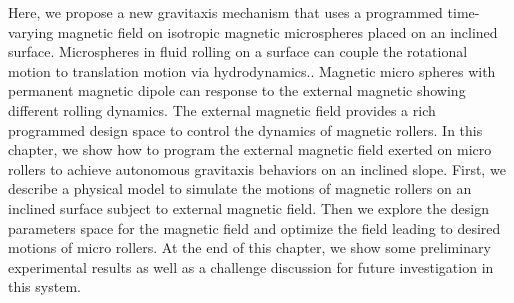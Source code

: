 Here, we propose a new gravitaxis mechanism that uses a programmed time-varying magnetic field on isotropic magnetic microspheres placed on an inclined surface. Microspheres in fluid rolling on a surface can couple the rotational motion to translation motion via hydrodynamics.\autocite{galvin2001time,rashidi2016theoretical}. Magnetic micro spheres with permanent magnetic dipole  can response to the external  magnetic showing different rolling dynamics. \autocite{helgesen2019propulsion,helgesen2018magnetic}
The external magnetic field provides a rich programmed design space to control the dynamics of magnetic rollers.
In this chapter, we show how to program the external magnetic field exerted on  micro rollers to achieve autonomous gravitaxis behaviors on an inclined slope. First, we describe a physical model to simulate the motions of magnetic rollers on an inclined surface subject to external magnetic field. Then we explore the design parameters space for the magnetic field  and optimize the field leading to desired motions of  micro rollers. At the end of this chapter, we show some preliminary experimental results as well as a challenge discussion for future investigation in this system. 

